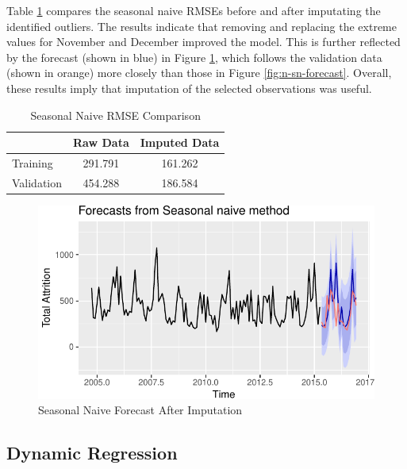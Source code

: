 \documentclass[12pt,letterpaper,toc=flat,oneside]{report}
\theoremstyle{definition}
\theoremstyle{definition}
\theoremstyle{definition}
\theoremstyle{remark}
\begin{document}
Table \ref{tab:season-rmse-compare} compares the seasonal naive RMSEs
before and after imputating the identified outliers. The results
indicate that removing and replacing the extreme values for November and
December improved the model. This is further reflected by the forecast
(shown in blue) in Figure \ref{fig:sn-forecast-2}, which follows the
validation data (shown in orange) more closely than those in Figure
\ref{fig:n-sn-forecast}. Overall, these results imply that imputation of
the selected observations was useful.

\begin{table}

\caption{\label{tab:season-rmse-compare}Seasonal Naive RMSE Comparison}
\centering
\begin{tabular}[t]{l|c|c}
\hline
  & Raw Data & Imputed Data\\
\hline
Training & 291.791 & 161.262\\
\hline
Validation & 454.288 & 186.584\\
\hline
\end{tabular}
\end{table}

\begin{figure}[H]

{\centering \includegraphics{elliott-econometric-personnel-retention-18_files/figure-latex/sn-forecast-2-1} 

}

\caption{Seasonal Naive Forecast After Imputation}\label{fig:sn-forecast-2}
\end{figure}

\hypertarget{dynamic-regression}{%
\subsection{Dynamic Regression}\label{dynamic-regression}}
\end{document}

